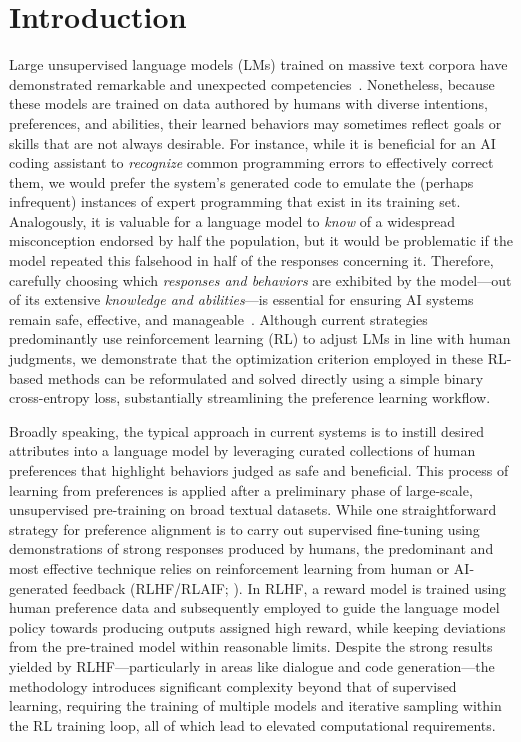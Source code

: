 \section{Introduction}
Large unsupervised language models (LMs) trained on massive text corpora have demonstrated remarkable and unexpected competencies~\citep{chowdhery2022palm, brown2020language, touvron2023llama,bubeck2023sparks}. Nonetheless, because these models are trained on data authored by humans with diverse intentions, preferences, and abilities, their learned behaviors may sometimes reflect goals or skills that are not always desirable. For instance, while it is beneficial for an AI coding assistant to \textit{recognize} common programming errors to effectively correct them, we would prefer the system’s generated code to emulate the (perhaps infrequent) instances of expert programming that exist in its training set. Analogously, it is valuable for a language model to \textit{know} of a widespread misconception endorsed by half the population, but it would be problematic if the model repeated this falsehood in half of the responses concerning it. Therefore, carefully choosing which \emph{responses and behaviors} are exhibited by the model—out of its extensive \textit{knowledge and abilities}—is essential for ensuring AI systems remain safe, effective, and manageable~\citep{ouyang2022training}. Although current strategies predominantly use reinforcement learning (RL) to adjust LMs in line with human judgments, we demonstrate that the optimization criterion employed in these RL-based methods can be reformulated and solved directly using a simple binary cross-entropy loss, substantially streamlining the preference learning workflow.

Broadly speaking, the typical approach in current systems is to instill desired attributes into a language model by leveraging curated collections of human preferences that highlight behaviors judged as safe and beneficial. This process of learning from preferences is applied after a preliminary phase of large-scale, unsupervised pre-training on broad textual datasets. While one straightforward strategy for preference alignment is to carry out supervised fine-tuning using demonstrations of strong responses produced by humans, the predominant and most effective technique relies on reinforcement learning from human or AI-generated feedback (RLHF/RLAIF; \citep{christiano2017deep,bai2022constitutional}). In RLHF, a reward model is trained using human preference data and subsequently employed to guide the language model policy towards producing outputs assigned high reward, while keeping deviations from the pre-trained model within reasonable limits. Despite the strong results yielded by RLHF—particularly in areas like dialogue and code generation—the methodology introduces significant complexity beyond that of supervised learning, requiring the training of multiple models and iterative sampling within the RL training loop, all of which lead to elevated computational requirements.

